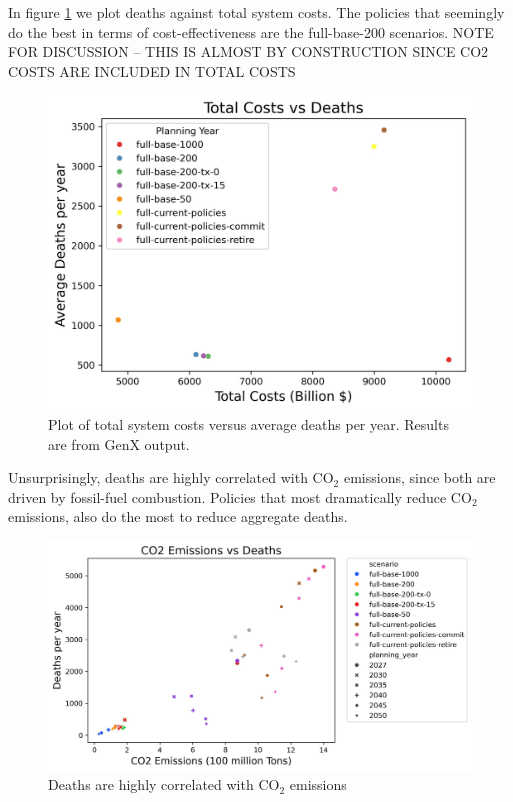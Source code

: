 \documentclass[a4paper]{article}
\theoremstyle{definition}
\theoremstyle{plain}
\begin{document}
In figure \ref{DeathsCosts} we plot deaths against total system costs.  The policies that seemingly do the best in terms of cost-effectiveness are the full-base-200 scenarios.  NOTE FOR DISCUSSION -- THIS IS ALMOST BY CONSTRUCTION SINCE CO2 COSTS ARE INCLUDED IN TOTAL COSTS
\begin{figure}
    \centering
    \includegraphics[width=0.8\linewidth]{Figures/Output/Deaths_vs_Costs_GenX.png}
    \caption{Plot of total system costs versus average deaths per year.  Results are from GenX output.}
    \label{DeathsCosts}
\end{figure}

Unsurprisingly, deaths are highly correlated with CO$_2$ emissions, since both are driven by fossil-fuel combustion.  Policies that most dramatically reduce CO$_2$ emissions, also do the most to reduce aggregate deaths.
\begin{figure}
    \centering
    \includegraphics[width=1\linewidth]{Figures/Output/Deaths_vs_Emissions_GenX.png}
    \caption{Deaths are highly correlated with CO$_2$ emissions}
    \label{DeathsEmissions}
\end{figure}
\end{document}
